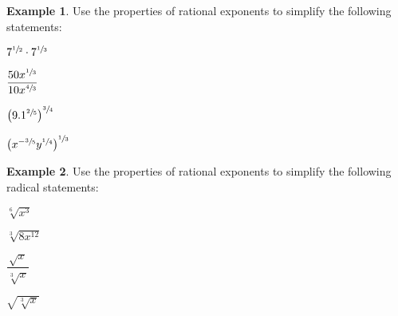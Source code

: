 \documentclass[addpoints,12pt]{exam}
\theoremstyle{definition}
\newtheorem{example}{Example}[subsection]
\begin{document}
\newpage

\begin{example}
Use the properties of rational exponents to simplify the following statements:
\begin{enumerate}
\begin{minipage}{.5\textwidth}
\item $7^{\sfrac{1}{2}}\cdot 7^{\sfrac{1}{3}}$
\vspace{1.25in}
\item $\dfrac{50x^{\sfrac{1}{3}}}{10x^{\sfrac{4}{3}}}$
\vspace{1.25in}
\end{minipage}%
\begin{minipage}{.5\textwidth}
\item $\left(9.1^{\sfrac{2}{5}}\right)^{\sfrac{3}{4}}$
\vspace{1.25in}
\item $\left(x^{-\sfrac{3}{5}}y^{\sfrac{1}{4}}\right)^{\sfrac{1}{3}}$
\vspace{1.25in}
\end{minipage}%
\end{enumerate}
\end{example}

\begin{example}
Use the properties of rational exponents to simplify the following radical statements:
\begin{enumerate}
\begin{minipage}{.5\textwidth}
\item $\sqrt[6]{x^3}$
\vspace{1.25in}
\item $\sqrt[3]{8x^{12}}$
\vspace{1.25in}
\end{minipage}%
\begin{minipage}{.5\textwidth}
\item $\dfrac{\sqrt{x}}{\sqrt[3]{x}}$
\vspace{1.25in}
\item $\sqrt{\sqrt[3]{x}}$
\vspace{1.25in}
\end{minipage}%
\end{enumerate}
\end{example}
\end{document}
